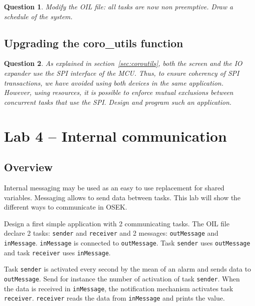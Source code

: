 \documentclass[11pt]{report}
\newtheorem{ex}{Question}
\begin{document}
\begin{ex}
Modify the OIL file: all tasks are now non preemptive. Draw a schedule of the system.
\end{ex}


\section{Upgrading the coro\_utils function}

\begin{ex}
    As explained in section~\ref{sec:coroutils}, both the screen and the IO
    expander use the SPI interface of the MCU. Thus, to ensure coherency of SPI
    transactions, we have avoided using both devices in the same application.
    However, using resources, it is possible to enforce mutual exclusions
    between concurrent tasks that use the SPI.
    Design and program such an application.
\end{ex}

\chapter{Lab 4 -- Internal communication}

\section{Overview}

Internal messaging may be used as an easy to use replacement for shared variables. Messaging allows to send data between tasks. This lab will show the different ways to communicate in OSEK.

Design a first simple application with 2 communicating tasks.
The OIL file declare 2 tasks: \texttt{sender} and \texttt{receiver} and 2 messages: \texttt{outMessage} and \texttt{inMessage}. \texttt{inMessage} is connected to \texttt{outMessage}. Task \texttt{sender} uses \texttt{outMessage} and task \texttt{receiver} uses \texttt{inMessage}.

Task \texttt{sender} is activated every second by the mean of an alarm and sends data to \texttt{outMessage}.
Send for instance the number of activation of task \texttt{sender}.
When the data is received in \texttt{inMessage}, the notification mechanism activates task \texttt{receiver}.
\texttt{receiver} reads the data from \texttt{inMessage} and prints the value.
\end{document}
